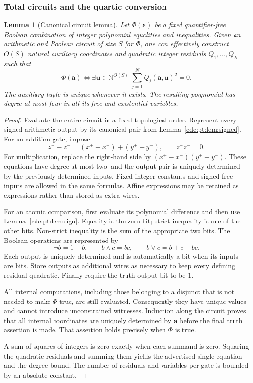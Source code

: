 \documentclass[11pt,a4paper]{article}
\newtheorem{lemma}[lemma]{Lemma}
\theoremstyle{definition}
\theoremstyle{remark}
\newcommand{\N}{\mathbb N}
\begin{document}
\subsubsection{Total circuits and the quartic conversion}
\begin{lemma}[Canonical circuit lemma]
\label{cdc:pt:lem:circuit}
Let $\Phi(\boldsymbol a)$ be a fixed quantifier-free Boolean combination of
integer polynomial equalities and inequalities. Given an arithmetic and
Boolean circuit of size $S$ for $\Phi$, one can effectively construct
$O(S)$ natural auxiliary coordinates and quadratic integer residuals
$Q_1,\ldots,Q_N$ such that
\[
 \Phi(\boldsymbol a)
 \iff \exists\boldsymbol u\in\N^{O(S)}\;
 \sum_{j=1}^N Q_j(\boldsymbol a,\boldsymbol u)^2=0.
\]
The auxiliary tuple is unique whenever it exists. The resulting polynomial
has degree at most four in \emph{all} its free and existential variables.
\end{lemma}
\begin{proof}
Evaluate the entire circuit in a fixed topological order. Represent every
signed arithmetic output by its canonical pair from
Lemma~\ref{cdc:pt:lem:signed}. For an addition gate, impose
\[
 z^+-z^-=(x^+-x^-)+(y^+-y^-),\qquad z^+z^-=0.
\]
For multiplication, replace the right-hand side by
$(x^+-x^-)(y^+-y^-)$. These equations have degree at most two, and the
output pair is uniquely determined by the previously determined inputs.
Fixed integer constants and signed free inputs are allowed in the same
formulas. Affine expressions may be retained as expressions rather than
stored as extra wires.

For an atomic comparison, first evaluate its polynomial difference and then
use Lemma~\ref{cdc:pt:lem:sign}. Equality is the zero bit; strict inequality is
one of the other bits. Non-strict inequality is the sum of the appropriate
two bits. The Boolean operations are represented by
\[
 \neg b=1-b,\qquad b\wedge c=bc,\qquad
 b\vee c=b+c-bc.
\]
Each output is uniquely determined and is automatically a bit when its
inputs are bits. Store outputs as additional wires as necessary to keep
every defining residual quadratic. Finally require the truth-output bit to
be $1$.

All internal computations, including those belonging to a disjunct that is
not needed to make $\Phi$ true, are still evaluated. Consequently they
have unique values and cannot introduce unconstrained witnesses.
Induction along the circuit proves that all internal coordinates are
uniquely determined by $\boldsymbol a$ before the final truth assertion is
made. That assertion holds precisely when $\Phi$ is true.

A sum of squares of integers is zero exactly when each summand is zero.
Squaring the quadratic residuals and summing them yields the advertised
single equation and the degree bound. The number of residuals and variables
per gate is bounded by an absolute constant.
\end{proof}
\end{document}
